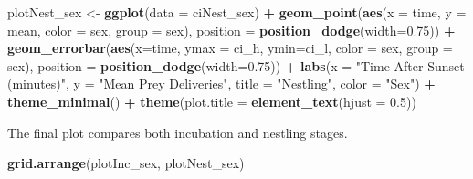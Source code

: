 \documentclass[]{article}
\newenvironment{Shaded}{\begin{snugshade}}{\end{snugshade}}
\newcommand{\DataTypeTok}[1]{\textcolor[rgb]{0.13,0.29,0.53}{#1}}
\newcommand{\FloatTok}[1]{\textcolor[rgb]{0.00,0.00,0.81}{#1}}
\newcommand{\KeywordTok}[1]{\textcolor[rgb]{0.13,0.29,0.53}{\textbf{#1}}}
\newcommand{\NormalTok}[1]{#1}
\newcommand{\OperatorTok}[1]{\textcolor[rgb]{0.81,0.36,0.00}{\textbf{#1}}}
\newcommand{\StringTok}[1]{\textcolor[rgb]{0.31,0.60,0.02}{#1}}
\begin{document}
\begin{Shaded}
\begin{Highlighting}[]
\NormalTok{plotNest_sex <-}\StringTok{ }\KeywordTok{ggplot}\NormalTok{(}\DataTypeTok{data =}\NormalTok{ ciNest_sex) }\OperatorTok{+}
\StringTok{  }\KeywordTok{geom_point}\NormalTok{(}\KeywordTok{aes}\NormalTok{(}\DataTypeTok{x =}\NormalTok{ time, }\DataTypeTok{y =}\NormalTok{ mean, }\DataTypeTok{color =}\NormalTok{ sex, }\DataTypeTok{group =}\NormalTok{ sex),}
             \DataTypeTok{position =} \KeywordTok{position_dodge}\NormalTok{(}\DataTypeTok{width=}\FloatTok{0.75}\NormalTok{)) }\OperatorTok{+}
\StringTok{  }\KeywordTok{geom_errorbar}\NormalTok{(}\KeywordTok{aes}\NormalTok{(}\DataTypeTok{x=}\NormalTok{time, }\DataTypeTok{ymax =}\NormalTok{ ci_h, }\DataTypeTok{ymin=}\NormalTok{ci_l, }\DataTypeTok{color =}\NormalTok{ sex, }
                    \DataTypeTok{group =}\NormalTok{ sex),}
                \DataTypeTok{position =} \KeywordTok{position_dodge}\NormalTok{(}\DataTypeTok{width=}\FloatTok{0.75}\NormalTok{)) }\OperatorTok{+}
\StringTok{  }\KeywordTok{labs}\NormalTok{(}\DataTypeTok{x =} \StringTok{"Time After Sunset (minutes)"}\NormalTok{, }\DataTypeTok{y =} \StringTok{"Mean Prey Deliveries"}\NormalTok{, }
       \DataTypeTok{title =} \StringTok{"Nestling"}\NormalTok{, }\DataTypeTok{color =} \StringTok{"Sex"}\NormalTok{) }\OperatorTok{+}
\StringTok{  }\KeywordTok{theme_minimal}\NormalTok{() }\OperatorTok{+}
\StringTok{  }\KeywordTok{theme}\NormalTok{(}\DataTypeTok{plot.title =} \KeywordTok{element_text}\NormalTok{(}\DataTypeTok{hjust =} \FloatTok{0.5}\NormalTok{)) }
\end{Highlighting}
\end{Shaded}

The final plot compares both incubation and nestling stages.

\begin{Shaded}
\begin{Highlighting}[]
\KeywordTok{grid.arrange}\NormalTok{(plotInc_sex, plotNest_sex)}
\end{Highlighting}
\end{Shaded}
\end{document}
